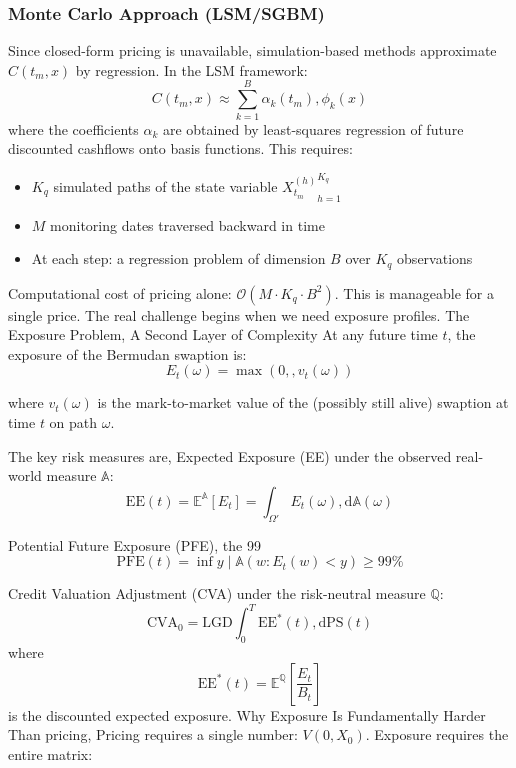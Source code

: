     \subsubsection{Monte Carlo Approach (LSM/SGBM)}
     Since closed-form pricing is unavailable, simulation-based methods approximate $C(t_m, x)$ by regression. In the LSM framework:
     \begin{equation}
         C(t_m, x) \approx \sum_{k=1}^{B} \alpha_k(t_m),\phi_k(x)
     \end{equation}
  \noindent
  where the coefficients $\alpha_k$ are obtained by least-squares regression of future discounted cashflows onto basis functions. This requires:
 \begin{itemize}
     \item $K_q$ simulated paths of the state variable ${X_{t_m}^{(h)}}_{h=1}^{K_q}$
     \item $M$ monitoring dates traversed backward in time
     \item At each step: a regression problem of dimension $B$ over $K_q$ observations
 \end{itemize}
  \noindent
  Computational cost of pricing alone: $\mathcal{O}(M \cdot K_q \cdot B^2)$. This is manageable for a single price. The real challenge begins when we need exposure profiles. The Exposure Problem, A Second Layer of Complexity At any future time $t$, the exposure of the Bermudan swaption is:
 \begin{equation}
    E_t(\omega) = \max(0,, v_t(\omega)) 
 \end{equation}
 
  \noindent
  where $v_t(\omega)$ is the mark-to-market value of the (possibly still alive) swaption at time $t$ on path $\omega$.

  The key risk measures are, Expected Exposure (EE) under the observed real-world measure $\mathbb{A}$:
  \begin{equation}
      \text{EE}(t) = \mathbb{E}^{\mathbb{A}}[E_t] = \int_{\Omega'} E_t(\omega),\mathrm{d}\mathbb{A}(\omega)
  \end{equation}
  
  Potential Future Exposure (PFE), the 99%
    \begin{equation}
        \text{PFE}(t) = \inf{y \mid \mathbb{A}({w: E_t(w) < y}) \geq 99\%}
    \end{equation}
  $$$$

  Credit Valuation Adjustment (CVA) under the risk-neutral measure $\mathbb{Q}$:
 \begin{equation}
     \text{CVA}_0 = \text{LGD} \int_0^T \text{EE}^*(t),\mathrm{d}\text{PS}(t)
 \end{equation}
  \noindent
  where 
  \begin{equation}
      \text{EE}^*(t) = \mathbb{E}^{\mathbb{Q}}\left[\frac{E_t}{B_t}\right]
  \end{equation}
  \noindent
  is the discounted expected exposure. Why Exposure Is Fundamentally Harder Than pricing, Pricing requires a single number: $V(0, X_0)$. Exposure requires the entire matrix:

